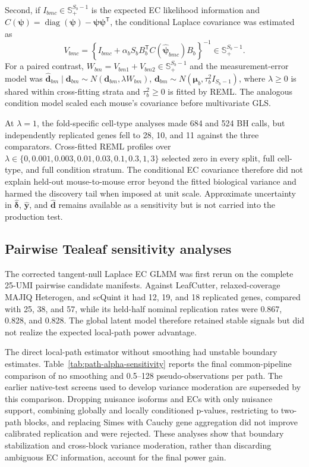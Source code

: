 \documentclass[11pt]{article}
\begin{document}
Second, if \(I_{bmc}\in\mathbb S_+^{S_b-1}\) is the expected EC likelihood information and \(C(\bm\psi)=\operatorname{diag}(\bm\psi)-\bm\psi\bm\psi^{\mathsf T}\), the conditional Laplace covariance was estimated as \[V_{bmc}=\left\{I_{bmc}+\alpha_bS_bB_b^{\mathsf T}C(\widehat{\bm\psi}_{bmc})B_b\right\}^{-1}\in\mathbb S_+^{S_b-1}.\] For a paired contrast, \(W_{bm}=V_{bm1}+V_{bm2}\in\mathbb S_+^{S_b-1}\) and the measurement-error model was \(\widehat{\bm d}_{bm}\mid\bm d_{bm}\sim N(\bm d_{bm},\lambda W_{bm})\), \(\bm d_{bm}\sim N(\bm\mu_b,\tau_b^2I_{S_b-1})\), where \(\lambda\geq0\) is shared within cross-fitting strata and \(\tau_b^2\geq0\) is fitted by REML. The analogous condition model scaled each mouse's covariance before multivariate GLS.

At \(\lambda=1\), the fold-specific cell-type analyses made 684 and 524 BH calls, but independently replicated genes fell to 28, 10, and 11 against the three comparators. Cross-fitted REML profiles over \(\lambda\in\{0,0.001,0.003,0.01,0.03,0.1,0.3,1,3\}\) selected zero in every split, full cell-type, and full condition stratum. The conditional EC covariance therefore did not explain held-out mouse-to-mouse error beyond the fitted biological variance and harmed the discovery tail when imposed at unit scale. Approximate uncertainty in \(\widehat{\bm\delta}\), \(\widehat{\bm y}\), and \(\widehat{\bm d}\) remains available as a sensitivity but is not carried into the production test.

\subsection*{Pairwise Tealeaf sensitivity analyses}

The corrected tangent-null Laplace EC GLMM was first rerun on the complete 25-UMI pairwise candidate manifests. Against LeafCutter, relaxed-coverage MAJIQ Heterogen, and scQuint it had 12, 19, and 18 replicated genes, compared with 25, 38, and 57, while its held-half nominal replication rates were 0.867, 0.828, and 0.828. The global latent model therefore retained stable signals but did not realize the expected local-path power advantage.

The direct local-path estimator without smoothing had unstable boundary estimates. Table~\ref{tab:path-alpha-sensitivity} reports the final common-pipeline comparison of no smoothing and 0.5--128 pseudo-observations per path. The earlier native-test screens used to develop variance moderation are superseded by this comparison. Dropping nuisance isoforms and ECs with only nuisance support, combining globally and locally conditioned p-values, restricting to two-path blocks, and replacing Simes with Cauchy gene aggregation did not improve calibrated replication and were rejected. These analyses show that boundary stabilization and cross-block variance moderation, rather than discarding ambiguous EC information, account for the final power gain.
\end{document}
